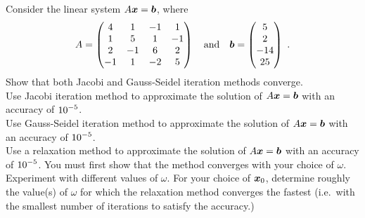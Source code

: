 \begin{question}
Consider the linear system $A\bm{x} = \bm{b}$, where
\[
A = \begin{pmatrix} 4 & 1 & -1 & 1 \\ 1 & 5 & 1 & -1 \\
2 & -1 & 6 & 2 \\ -1 & 1 & -2 & 5
\end{pmatrix}
\quad \text{and} \quad
\bm{b} = \begin{pmatrix} 5 \\ 2 \\ -14 \\ 25 \end{pmatrix} \ .
\]
 Show that both Jacobi and Gauss-Seidel iteration methods
converge.\\
 Use Jacobi iteration method to approximate the solution of
$A\bm{x} = \bm{b}$ with an accuracy of $\displaystyle 10^{-5}$.\\
 Use Gauss-Seidel iteration method to approximate the solution of
$A\bm{x} = \bm{b}$ with an accuracy of $\displaystyle 10^{-5}$.\\
 Use a relaxation method to approximate the solution of
$A\bm{x} = \bm{b}$ with an accuracy of $\displaystyle 10^{-5}$.  You
must first show that the method converges with your choice of $\omega$.
Experiment with different values of $\omega$.  For your choice of
$\bm{x}_0$, determine roughly the value(s) of $\omega$ for which the
relaxation method converges the fastest (i.e.\ with the smallest number
of iterations to satisfy the accuracy.)
\end{question}


